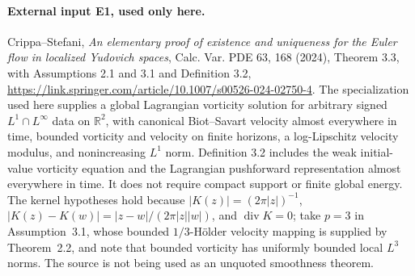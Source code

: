\documentclass[11pt]{article}
\theoremstyle{remark}\newtheorem{remark}[theorem]{Remark}
\newcommand{\R}{\mathbb R}
\newcommand{\Div}{\operatorname{div}}
\begin{document}
\paragraph{External input E1, used only here.}
Crippa--Stefani, \emph{An elementary proof of existence and uniqueness for the
Euler flow in localized Yudovich spaces}, Calc. Var. PDE 63, 168 (2024),
Theorem 3.3, with Assumptions 2.1 and 3.1 and Definition 3.2,
\url{https://link.springer.com/article/10.1007/s00526-024-02750-4}.
The specialization used here supplies a global Lagrangian vorticity solution for
arbitrary signed $L^1\cap L^\infty$ data on $\R^2$, with canonical Biot--Savart
velocity almost everywhere in time, bounded vorticity and velocity on finite
horizons, a log-Lipschitz velocity modulus, and nonincreasing $L^1$ norm.
Definition 3.2 includes the weak initial-value vorticity equation and the
Lagrangian pushforward representation almost everywhere in time. It does not require compact support or finite global energy.
The kernel hypotheses hold because $|K(z)|=(2\pi|z|)^{-1}$,
$|K(z)-K(w)|=|z-w|/(2\pi|z||w|)$, and $\Div K=0$; take $p=3$ in Assumption~3.1, whose bounded
$1/3$-H\"older velocity mapping is supplied by Theorem~2.2, and note that
bounded vorticity has uniformly bounded local $L^3$ norms.
The source is not being used as an unquoted smoothness theorem.
\end{document}
